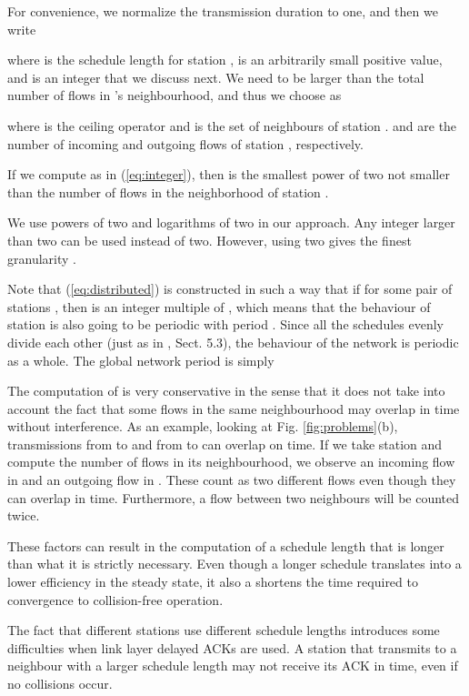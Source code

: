 \documentclass[twocolumn]{svjour3}          \smartqed  \usepackage{graphicx}
\begin{document}
For convenience, we normalize the transmission duration to one, and then we write

where  is the schedule length for station ,  is an arbitrarily small positive value, and  is an integer that we discuss next.
We need  to be larger than the total number of flows in 's neighbourhood, and thus we choose  as

where  is the ceiling operator and  is the set of neighbours of station .  and  are the number of incoming and outgoing flows of station , respectively.

If we compute  as in (\ref{eq:integer}), then  is the smallest power of two not smaller than the number of flows in the neighborhood of station .

We use powers of two and logarithms of two in our approach.
Any integer larger than two can be used instead of two.
However, using two gives the finest granularity \cite{fang2010dlm}.

Note that (\ref{eq:distributed}) is constructed in such a way that if  for some pair of stations , then  is an integer multiple of , which means that the behaviour of station  is also going to be periodic with period .
Since all the schedules evenly divide each other (just as in \cite{fang2010dlm}, Sect. 5.3), the behaviour of the network is periodic as a whole.
The global network period is simply 



The computation of  is very conservative in the sense that it does not take into account the fact that some flows in the same neighbourhood may overlap in time without interference.
As an example, looking at Fig. \ref{fig:problems}(b), transmissions from  to  and from  to  can overlap on time.
If we take station  and compute the number of flows in its neighbourhood, we observe an incoming flow in  and an outgoing flow in .
These count as two different flows even though they can overlap in time.
Furthermore, a flow between two neighbours will be counted twice.

These factors can result in the computation of a schedule length that is longer than what it is strictly necessary.
Even though a longer schedule translates into a lower efficiency in the steady state, it also a shortens the time required to convergence to collision-free operation.

The fact that different stations use different schedule lengths introduces some difficulties when link layer delayed ACKs are used.
A station that transmits to a neighbour with a larger schedule length may not receive its ACK in time, even if no collisions occur.
\end{document}
